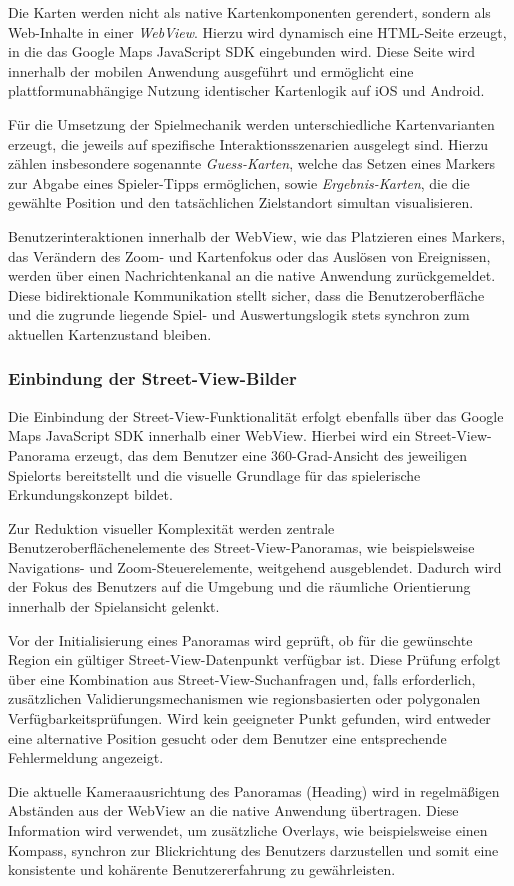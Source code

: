 Die Karten werden nicht als native Kartenkomponenten gerendert, sondern als Web-Inhalte in einer \textit{WebView}. 
Hierzu wird dynamisch eine HTML-Seite erzeugt, in die das Google Maps JavaScript SDK eingebunden wird. 
Diese Seite wird innerhalb der mobilen Anwendung ausgeführt und ermöglicht eine plattformunabhängige Nutzung identischer Kartenlogik auf iOS und Android.

Für die Umsetzung der Spielmechanik werden unterschiedliche Kartenvarianten erzeugt, die jeweils auf spezifische Interaktionsszenarien ausgelegt sind. 
Hierzu zählen insbesondere sogenannte \emph{Guess-Karten}, welche das Setzen eines Markers zur Abgabe eines Spieler-Tipps ermöglichen, sowie \emph{Ergebnis-Karten}, die die gewählte Position und den tatsächlichen Zielstandort simultan visualisieren.

Benutzerinteraktionen innerhalb der WebView, wie das Platzieren eines Markers, das Verändern des Zoom- und Kartenfokus oder das Auslösen von Ereignissen, werden über einen Nachrichtenkanal an die native Anwendung zurückgemeldet. 
Diese bidirektionale Kommunikation stellt sicher, dass die Benutzeroberfläche und die zugrunde liegende Spiel- und Auswertungslogik stets synchron zum aktuellen Kartenzustand bleiben.

\subsubsection{Einbindung der Street-View-Bilder}
Die Einbindung der Street-View-Funktionalität erfolgt ebenfalls über das Google Maps JavaScript SDK innerhalb einer WebView. 
Hierbei wird ein Street-View-Panorama erzeugt, das dem Benutzer eine 360-Grad-Ansicht des jeweiligen Spielorts bereitstellt und die visuelle Grundlage für das spielerische Erkundungskonzept bildet.

Zur Reduktion visueller Komplexität werden zentrale Benutzeroberflächenelemente des Street-View-Panoramas, wie beispielsweise Navigations- und Zoom-Steuerelemente, weitgehend ausgeblendet. 
Dadurch wird der Fokus des Benutzers auf die Umgebung und die räumliche Orientierung innerhalb der Spielansicht gelenkt.

Vor der Initialisierung eines Panoramas wird geprüft, ob für die gewünschte Region ein gültiger Street-View-Datenpunkt verfügbar ist. 
Diese Prüfung erfolgt über eine Kombination aus Street-View-Suchanfragen und, falls erforderlich, zusätzlichen Validierungsmechanismen wie regionsbasierten oder polygonalen Verfügbarkeitsprüfungen. 
Wird kein geeigneter Punkt gefunden, wird entweder eine alternative Position gesucht oder dem Benutzer eine entsprechende Fehlermeldung angezeigt.

Die aktuelle Kameraausrichtung des Panoramas (Heading) wird in regelmäßigen Abständen aus der WebView an die native Anwendung übertragen. 
Diese Information wird verwendet, um zusätzliche Overlays, wie beispielsweise einen Kompass, synchron zur Blickrichtung des Benutzers darzustellen und somit eine konsistente und kohärente Benutzererfahrung zu gewährleisten.

